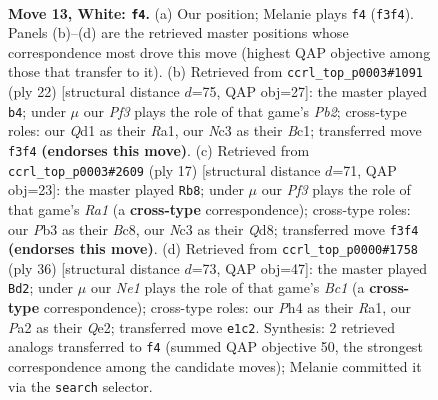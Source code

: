 \documentclass[11pt]{article}
\begin{document}
\begin{figure}[p]
\label{fig:thought-m22}
\end{figure}

\clearpage

\begin{figure}[p]\centering
\begin{subfigure}{0.46\textwidth}\centering
\resizebox{\linewidth}{!}{%
\newchessgame
\chessboard[
  setfen={r1bq1r1k/5pb1/1pnp1np1/p1p1p2p/2P4P/BPN2PP1/P2PP1B1/1R1QNRK1 w - - 0 13},
  showmover=false,
  pgfstyle=straightmove, color=movearrow, markmove={f3-f4}
]}
\caption{}
\end{subfigure}\hfill
\begin{subfigure}{0.46\textwidth}\centering
\resizebox{\linewidth}{!}{%
\newchessgame
\chessboard[
  setfen={r1bq1rk1/1pp2pbp/n2p1np1/p2Pp3/2P5/P1N2NP1/1P2PPBP/R1BQ1RK1 w - - 1 12},
  showmover=false,
  pgfstyle=straightmove, color=movearrow, markmove={b2-b4}
]}
\caption{}
\end{subfigure}
\\[4pt]
\begin{subfigure}{0.46\textwidth}\centering
\resizebox{\linewidth}{!}{%
\newchessgame
\chessboard[
  setfen={r1bq1rk1/pp2p1bp/2np1np1/2p2p2/4PP2/2NP1NP1/PPP3BP/R1BQR1K1 b - - 5 9},
  showmover=false,
  pgfstyle=straightmove, color=movearrow, markmove={a8-b8}
]}
\caption{}
\end{subfigure}\hfill
\begin{subfigure}{0.46\textwidth}\centering
\resizebox{\linewidth}{!}{%
\newchessgame
\chessboard[
  setfen={r1bq1rk1/6bp/p1pn1np1/Pp1p1p2/1P1P1P2/1N1BPN2/4Q1PP/R1B2RK1 w - - 7 19},
  showmover=false,
  pgfstyle=straightmove, color=movearrow, markmove={c1-d2}
]}
\caption{}
\end{subfigure}
\caption{\textbf{Move 13, White: \texttt{f4}.} (a) Our position; Melanie plays \texttt{f4} (\texttt{f3f4}). Panels (b)--(d) are the retrieved master positions whose correspondence most drove this move (highest QAP objective among those that transfer to it). (b) Retrieved from \texttt{ccrl\_top\_p0003\#1091} (ply 22) [structural distance $d$=75, QAP obj=27]: the master played \texttt{b4}; under $\mu$ our \emph{Pf3} plays the role of that game's \emph{Pb2}; cross-type roles: our \emph{Q}d1 as their \emph{R}a1, our \emph{N}c3 as their \emph{B}c1; transferred move \texttt{f3f4} \textbf{(endorses this move)}. (c) Retrieved from \texttt{ccrl\_top\_p0003\#2609} (ply 17) [structural distance $d$=71, QAP obj=23]: the master played \texttt{Rb8}; under $\mu$ our \emph{Pf3} plays the role of that game's \emph{Ra1} (a \textbf{cross-type} correspondence); cross-type roles: our \emph{P}b3 as their \emph{B}c8, our \emph{N}c3 as their \emph{Q}d8; transferred move \texttt{f3f4} \textbf{(endorses this move)}. (d) Retrieved from \texttt{ccrl\_top\_p0000\#1758} (ply 36) [structural distance $d$=73, QAP obj=47]: the master played \texttt{Bd2}; under $\mu$ our \emph{Ne1} plays the role of that game's \emph{Bc1} (a \textbf{cross-type} correspondence); cross-type roles: our \emph{P}h4 as their \emph{R}a1, our \emph{P}a2 as their \emph{Q}e2; transferred move \texttt{e1c2}. Synthesis: 2 retrieved analogs transferred to \texttt{f4} (summed QAP objective 50, the strongest correspondence among the candidate moves); Melanie committed it via the \texttt{search} selector.}

\end{figure}
\end{document}
